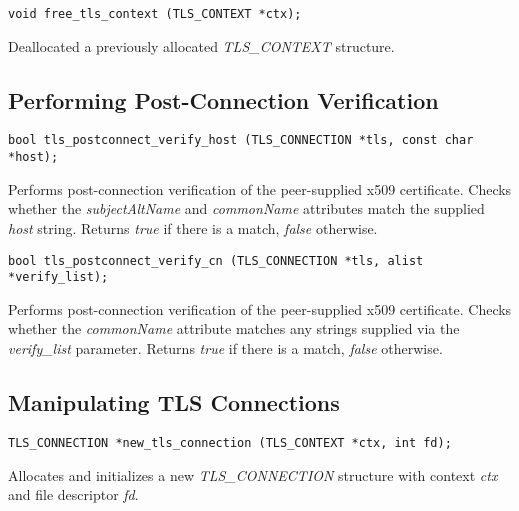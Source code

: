 \footnotesize
\begin{verbatim}
void free_tls_context (TLS_CONTEXT *ctx);
\end{verbatim}
\normalsize

Deallocated a previously allocated \emph{TLS\_CONTEXT} structure.

\subsection{Performing Post-Connection Verification}

\footnotesize
\begin{verbatim}
bool tls_postconnect_verify_host (TLS_CONNECTION *tls, const char *host);
\end{verbatim}
\normalsize

Performs post-connection verification of the peer-supplied x509
certificate.  Checks whether the \emph{subjectAltName} and
\emph{commonName} attributes match the supplied \emph{host} string.
Returns \emph{true} if there is a match, \emph{false} otherwise.

\footnotesize
\begin{verbatim}
bool tls_postconnect_verify_cn (TLS_CONNECTION *tls, alist *verify_list);
\end{verbatim}
\normalsize

Performs post-connection verification of the peer-supplied x509
certificate.  Checks whether the \emph{commonName} attribute matches any
strings supplied via the \emph{verify\_list} parameter.  Returns
\emph{true} if there is a match, \emph{false} otherwise.

\subsection{Manipulating TLS Connections}

\footnotesize
\begin{verbatim}
TLS_CONNECTION *new_tls_connection (TLS_CONTEXT *ctx, int fd);
\end{verbatim}
\normalsize

Allocates and initializes a new \emph{TLS\_CONNECTION} structure with
context \emph{ctx} and file descriptor \emph{fd}.

